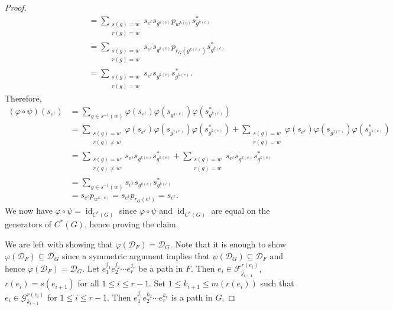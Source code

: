 \documentclass[12pt]{amsbook}%
\renewcommand{\phi}{\varphi}
\theoremstyle{defin}
\theoremstyle{remark}
\numberwithin{equation}{chapter}
\numberwithin{theor}{section}
\newcommand{\id}{\operatorname{id}}
\begin{document}
\begin{proof}
\begin{align*}
&= \sum_{ \substack{ s(g)=w \\  r(g)= w}  } s_{e^\ell } s_{ g^{k(e)} } p_{w^{k(g)} } s_{g^{k(e)}}^*  \\
&= \sum_{ \substack{ s(g)=w \\  r(g)= w}  } s_{e^\ell } s_{ g^{k(e)} } p_{r_G(g^{k(e)}) } s_{g^{k(e)}}^*  \\
&= \sum_{ \substack{ s(g)=w \\  r(g)= w}  } s_{e^\ell } s_{ g^{k(e)} } s_{g^{k(e)}}^*.
\end{align*}
Therefore, 
\begin{align*}
( \phi \circ \psi )( s_{ e^\ell } )&= \sum_{ g \in s^{-1} (w) }  \phi ( s_{e^\ell} ) \phi ( s_{ g^{j(e)} } ) \phi ( s_{ g^{k(e)}}^* )  \\
		&= \sum_{ \substack{ s(g)=w \\  r(g)\neq w}  }   \phi ( s_{e^\ell} ) \phi ( s_{ g^{j(e)} } ) \phi ( s_{ g^{k(e)}}^* ) + \sum_{ \substack{ s(g)=w \\  r(g)= w}  }   \phi ( s_{e^\ell} ) \phi ( s_{ g^{j(e)} } ) \phi ( s_{ g^{k(e)}}^* ) \\
		&=\sum_{ \substack{ s(g)=w \\  r(g)\neq w}  } s_{ e^\ell } s_{g^{k(e)}} s_{g^{k(e)}}^* + \sum_{ \substack{ s(g)=w \\  r(g)= w}  } s_{e^\ell } s_{ g^{k(e)} } s_{g^{k(e)}}^*   \\
&= \sum_{ g \in s^{-1} (w) } s_{ e^\ell } s_{g^{k(e)}} s_{g^{k(e)}}^* \\
&= s_{ e^\ell } p_{w^{k(e)}} = s_{e^{\ell}} p_{r_G(e^\ell)} = s_{e^{\ell}}.  
\end{align*}
We now have $\phi \circ \psi = \id_{C^*(G)}$ since $\phi \circ \psi$ and $\id_{C^*(G)}$ are equal on the generators of $C^*(G)$, hence proving the claim.


We are left with showing that $\phi ( \mathcal{D}_F ) = \mathcal{D}_G$.  Note that it is enough to show $\phi ( \mathcal{D}_F ) \subseteq \mathcal{D}_G$ since a symmetric argument implies that $\psi ( \mathcal{D}_G ) \subseteq \mathcal{D}_F$ and hence $\phi ( \mathcal{D}_F ) =  \mathcal{D}_G$.   Let $e_1^{j_1} e_{2}^{j_2} \cdots e_r^{j_r}$ be a path in $F$.  Then $e_i \in \mathcal{F}_{j_{i+1}}^{r(e_i)}$, $r( e_i ) = s( e_{i+1} )$ for all $1 \leq i \leq r-1$.  Set  $1 \leq k_{i+1} \leq m ( r( e_i ) )$ such that $e_i \in \mathcal{G}_{ k_{i+1} }^{r( e_i ) }$ for $1 \leq i \leq r - 1$.  Then $e_1^{ j_1 } e_2^{ k_2 } \cdots e_{r}^{k_r}$ is a path in $G$. 


\end{proof}
\end{document}
